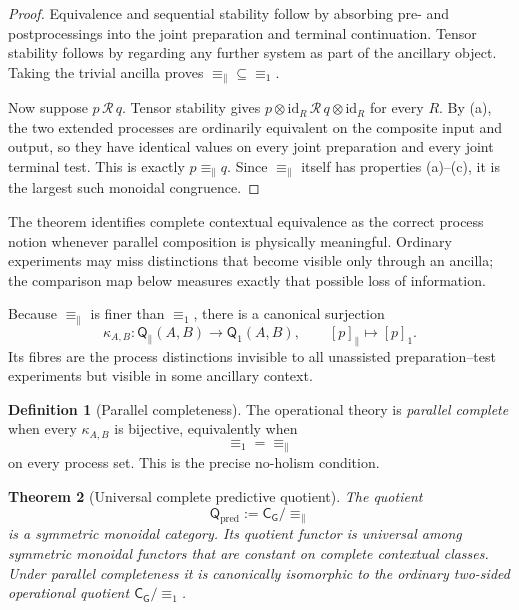 \documentclass[11pt]{article}
\newtheorem{theorem}{Theorem}[section]
\theoremstyle{definition}
\newtheorem{definition}[theorem]{Definition}
\theoremstyle{remark}
\newcommand{\id}{\mathrm{id}}
\newcommand{\Qq}{\mathsf Q}
\newcommand{\pred}{\mathrm{pred}}
\begin{document}
\begin{proof}
Equivalence and sequential stability follow by absorbing pre- and
postprocessings into the joint preparation and terminal continuation.  Tensor
stability follows by regarding any further system as part of the ancillary
object.  Taking the trivial ancilla proves
$\equiv_{\parallel}\subseteq\equiv_1$.

Now suppose $p\,\mathcal R\,q$.  Tensor stability gives
$p\otimes\id_R\,\mathcal R\,q\otimes\id_R$ for every $R$.  By (a), the two
extended processes are ordinarily equivalent on the composite input and output,
so they have identical values on every joint preparation and every joint
terminal test.  This is exactly $p\equiv_{\parallel}q$.  Since
$\equiv_{\parallel}$ itself has properties (a)--(c), it is the largest such
monoidal congruence.
\end{proof}

The theorem identifies complete contextual equivalence as the correct process
notion whenever parallel composition is physically meaningful.  Ordinary
experiments may miss distinctions that become visible only through an ancilla;
the comparison map below measures exactly that possible loss of information.

Because $\equiv_{\parallel}$ is finer than $\equiv_1$, there is a canonical
surjection
\[
 \kappa_{A,B}:\Qq_{\parallel}(A,B)\longrightarrow\Qq_1(A,B),
 \qquad [p]_{\parallel}\longmapsto[p]_1.
\]
Its fibres are the process distinctions invisible to all unassisted
preparation--test experiments but visible in some ancillary context.

\begin{definition}[Parallel completeness]
\label{def:parallel-completeness}
The operational theory is \emph{parallel complete} when every $\kappa_{A,B}$ is
bijective, equivalently when
\[
 \equiv_1=\equiv_{\parallel}
\]
on every process set.  This is the precise no-holism condition.
\end{definition}

\begin{theorem}[Universal complete predictive quotient]
\label{thm:universal-quotient}
The quotient
\[
 \Qq_{\pred}:=\mathsf C_{\mathsf G}/\!\equiv_{\parallel}
\]
is a symmetric monoidal category.  Its quotient functor is universal among
symmetric monoidal functors that are constant on complete contextual
classes.  Under parallel completeness it is canonically isomorphic to the
ordinary two-sided operational quotient $\mathsf C_{\mathsf G}/\!\equiv_1$.
\end{theorem}
\end{document}
